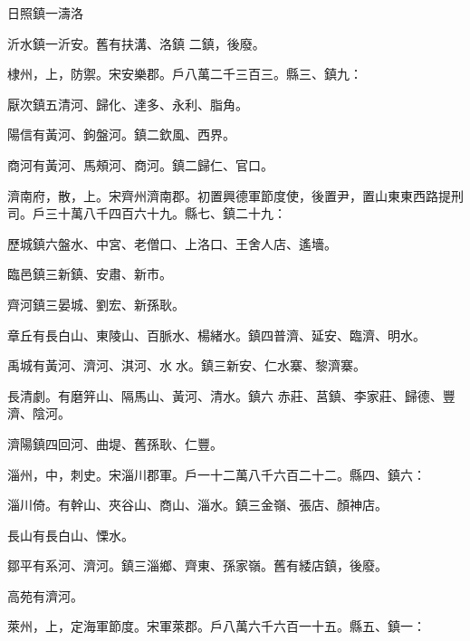 \begin{pinyinscope}
 日照鎮一濤洛



 沂水鎮一沂安。舊有扶溝、洛鎮
 二鎮，後廢。



 棣州，上，防禦。宋安樂郡。戶八萬二千三百三。縣三、鎮九：



 厭次鎮五清河、歸化、達多、永利、脂角。



 陽信有黃河、鉤盤河。鎮二欽風、西界。



 商河有黃河、馬頰河、商河。鎮二歸仁、官口。



 濟南府，散，上。宋齊州濟南郡。初置興德軍節度使，後置尹，置山東東西路提刑司。戶三十萬八千四百六十九。縣七、鎮二十九：



 歷城鎮六盤水、中宮、老僧口、上洛口、王舍人店、遙墻。



 臨邑鎮三新鎮、安肅、新市。



 齊河鎮三晏城、劉宏、新孫耿。



 章丘有長白山、東陵山、百脈水、楊緒水。鎮四普濟、延安、臨濟、明水。



 禹城有黃河、濟河、淇河、水水。鎮三新安、仁水寨、黎濟寨。



 長清劇。有磨笄山、隔馬山、黃河、清水。鎮六
 赤莊、莒鎮、李家莊、歸德、豐濟、陰河。



 濟陽鎮四回河、曲堤、舊孫耿、仁豐。



 淄州，中，刺史。宋淄川郡軍。戶一十二萬八千六百二十二。縣四、鎮六：



 淄川倚。有幹山、夾谷山、商山、淄水。鎮三金嶺、張店、顏神店。



 長山有長白山、慄水。



 鄒平有系河、濟河。鎮三淄鄉、齊東、孫家嶺。舊有緌店鎮，後廢。



 高苑有濟河。



 萊州，上，定海軍節度。宋軍萊郡。戶八萬六千六百一十五。縣五、鎮一：




\end{pinyinscope}
